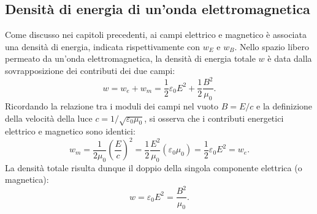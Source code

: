 \documentclass[a4paper,11pt]{report}
\begin{document}
\subsection{Densità di energia di un'onda elettromagnetica}
Come discusso nei capitoli precedenti, ai campi elettrico e magnetico è associata una densità di energia, indicata rispettivamente con $w_E$ e $w_B$.
Nello spazio libero permeato da un'onda elettromagnetica, la densità di energia totale $w$ è data dalla sovrapposizione dei contributi dei due campi:
\begin{equation}
w = w_e + w_m = \frac{1}{2} \varepsilon_0 E^2 + \frac{1}{2} \frac{B^2}{\mu_0}.
\end{equation}
Ricordando la relazione tra i moduli dei campi nel vuoto $B = E/c$ e la definizione della velocità della luce $c = 1/\sqrt{\varepsilon_0\mu_0}$, si osserva che i contributi energetici elettrico e magnetico sono identici:
\begin{equation}
w_m = \frac{1}{2\mu_0} \left( \frac{E}{c} \right)^2 = \frac{1}{2} \frac{E^2}{\mu_0} (\varepsilon_0 \mu_0) = \frac{1}{2} \varepsilon_0 E^2 = w_e.
\end{equation}
La densità totale risulta dunque il doppio della singola componente elettrica (o magnetica):
\begin{equation}
w = \varepsilon_0 E^2 = \frac{B^2}{\mu_0}.
\label{eq:ene_dens}
\end{equation}
\end{document}
